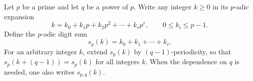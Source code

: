 Let $p$ be a prime and let $q$ be a power of $p$. Write any integer $k \ge 0$ in its $p$-adic expansion
$$k = k_0 + k_1 p + k_2 p^2 + \cdots + k_{r} p^{r}, \qquad 0 \le k_i \le p-1.$$
Define the $p$-adic digit sum
$$s_p(k) = k_0 + k_1 + \cdots + k_r.$$
For an arbitrary integer $k$, extend $s_p(k)$ by $(q-1)$-periodicity, so that $s_p(k + (q-1)) = s_p(k)$ for all integers $k$. When the dependence on $q$ is needed, one also writes $s_{p,q}(k)$.

